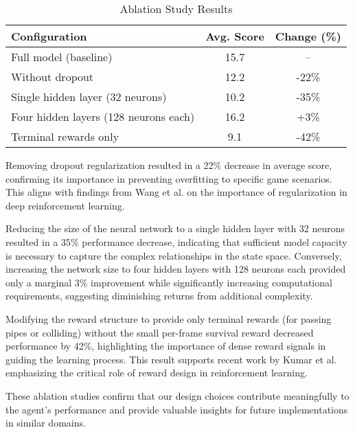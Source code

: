 \begin{table}[!t]
\caption{Ablation Study Results}
\label{tab:ablation}
\centering
\begin{tabular}{|l|c|c|}
\hline
\textbf{Configuration} & \textbf{Avg. Score} & \textbf{Change (\%)} \\
\hline
Full model (baseline) & 15.7 & -- \\
\hline
Without dropout & 12.2 & -22\% \\
\hline
Single hidden layer (32 neurons) & 10.2 & -35\% \\
\hline
Four hidden layers (128 neurons each) & 16.2 & +3\% \\
\hline
Terminal rewards only & 9.1 & -42\% \\
\hline
\end{tabular}
\end{table}

Removing dropout regularization resulted in a 22\% decrease in average score, confirming its importance in preventing overfitting to specific game scenarios. This aligns with findings from Wang et al. \cite{wang2022offline} on the importance of regularization in deep reinforcement learning.

Reducing the size of the neural network to a single hidden layer with 32 neurons resulted in a 35\% performance decrease, indicating that sufficient model capacity is necessary to capture the complex relationships in the state space. Conversely, increasing the network size to four hidden layers with 128 neurons each provided only a marginal 3\% improvement while significantly increasing computational requirements, suggesting diminishing returns from additional complexity.

Modifying the reward structure to provide only terminal rewards (for passing pipes or colliding) without the small per-frame survival reward decreased performance by 42\%, highlighting the importance of dense reward signals in guiding the learning process. This result supports recent work by Kumar et al. \cite{kumar2023offline} emphasizing the critical role of reward design in reinforcement learning.

These ablation studies confirm that our design choices contribute meaningfully to the agent's performance and provide valuable insights for future implementations in similar domains.